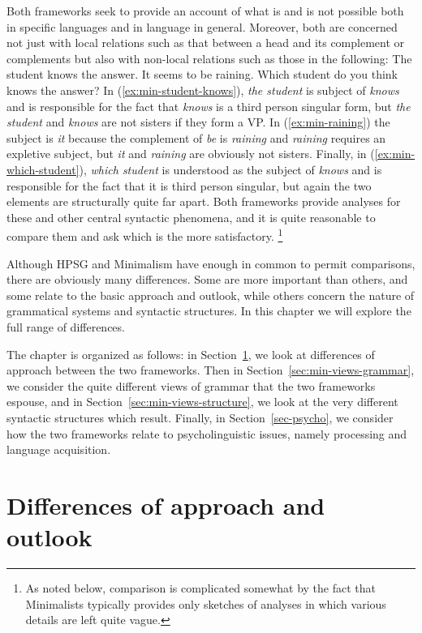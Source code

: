 \documentclass[output=paper]{langsci/langscibook}
\begin{document}
Both frameworks seek to provide an account of what is and is not possible both in specific languages and in language in general. Moreover, both are concerned not just with local relations such as that between a head and its complement or complements but also with non-local relations such as those in the following:
\eal
\ex\label{ex:min-student-knows}
The student knows the answer.
\ex\label{ex:min-raining}
It seems to be raining.
\ex\label{ex:min-which-student}
Which student do you think knows the answer? 
\zl
In (\ref{ex:min-student-knows}), \emph{the student} is subject of \emph{knows} and is
responsible for the fact that \emph{knows} is a third person singular form, but \emph{the student}
and \emph{knows} are not sisters if they form a VP. In (\ref{ex:min-raining}) the subject
is \emph{it} because the complement of \emph{be} is \emph{raining} and \emph{raining} requires an
expletive subject, but \emph{it} and \emph{raining} are
obviously not sisters. Finally, in (\ref{ex:min-which-student}), \emph{which student} is
understood as the subject of \emph{knows} and is responsible for the fact that it is third person
singular, but again the two elements are structurally quite far apart. Both frameworks provide
analyses for these and other central syntactic phenomena, and it is quite reasonable to compare them
and ask which is the more satisfactory.%
	\footnote{As noted below, comparison is complicated somewhat by the fact that Minimalists typically provides only sketches of analyses in which various details are left quite vague.}%

Although HPSG and Minimalism have enough in common to permit comparisons, there are obviously many differences. Some are more important than others, and some relate to the basic approach and outlook, while others concern the nature of grammatical systems and syntactic structures. In this chapter we will explore the full range of differences.

The chapter is organized as follows: in Section~\ref{sec:min-difference}, we look at differences of
approach between the two frameworks. Then in Section~\ref{sec:min-views-grammar}, we consider the
quite different views of grammar that the two frameworks espouse, and in
Section~\ref{sec:min-views-structure}, we look at the very different syntactic structures which
result. Finally, in Section~\ref{sec-psycho}, we consider how the two frameworks relate to
psycholinguistic issues, namely processing and language acquisition.

\section{Differences of approach and outlook}
\label{sec:min-difference}
\end{document}
